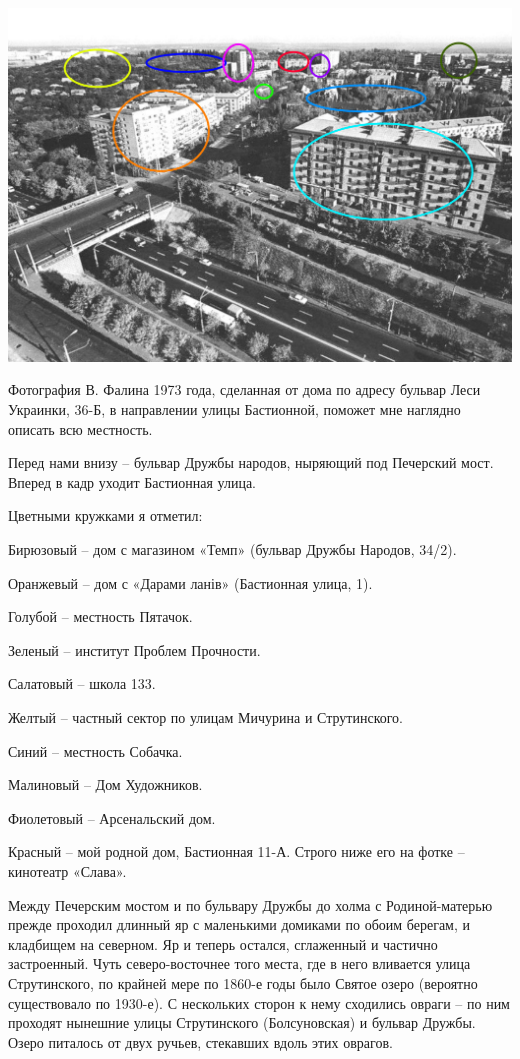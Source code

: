 \begin{center}
\includegraphics[width=\linewidth]{chast-vosp/zver/1973-falin-marks.jpg}
\end{center}

Фотография В. Фалина 1973 года, сделанная от дома по адресу бульвар Леси Украинки, 36-Б, в направлении улицы Бастионной, поможет мне наглядно описать всю местность.

Перед нами внизу – бульвар Дружбы народов, ныряющий под Печерский мост. Вперед в кадр уходит Бастионная улица.

Цветными кружками я отметил:

Бирюзовый – дом с магазином «Темп» (бульвар Дружбы Народов, 34/2).

Оранжевый – дом с «Дарами ланів» (Бастионная улица, 1).

Голубой – местность Пятачок.

Зеленый – институт Проблем Прочности.

Салатовый – школа 133.

Желтый – частный сектор по улицам Мичурина и Струтинского.

Синий – местность Собачка.

Малиновый – Дом Художников.

Фиолетовый – Арсенальский дом.

Красный – мой родной дом, Бастионная 11-А. Строго ниже его на фотке – кинотеатр «Слава».

Между Печерским мостом и по бульвару Дружбы до холма с Родиной-матерью прежде проходил длинный яр с маленькими домиками по обоим берегам, и кладбищем на северном. Яр и теперь остался, сглаженный и частично застроенный. Чуть северо-восточнее того места, где в него вливается улица Струтинского, по крайней мере по 1860-е годы было Святое озеро (вероятно существовало по 1930-е). С нескольких сторон к нему сходились овраги – по ним проходят нынешние улицы Струтинского (Болсуновская) и бульвар Дружбы. Озеро питалось от двух ручьев, стекавших вдоль этих оврагов.

